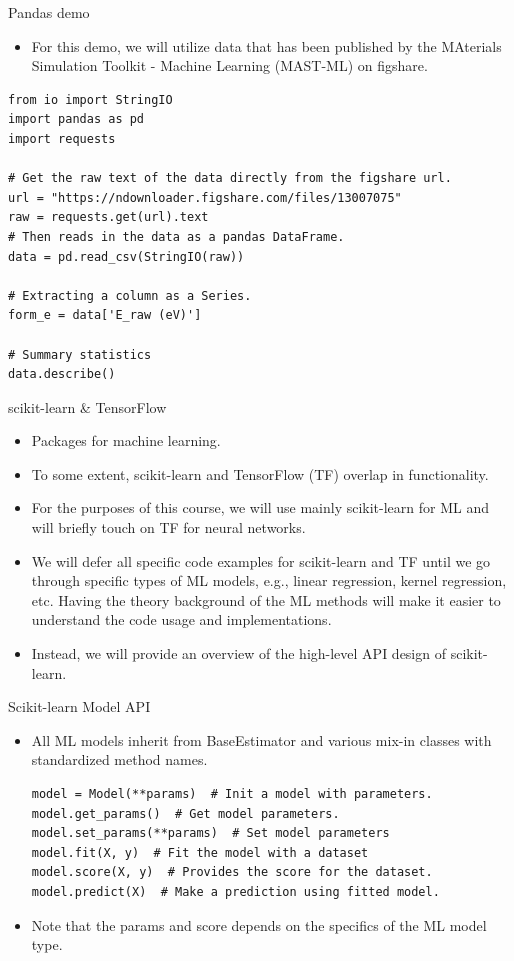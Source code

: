 \documentclass[aspectratio=169]{beamer}
\begin{document}
\begin{frame}[fragile]{Pandas demo}
    \begin{itemize}
        \item For this demo, we will utilize data that has been published by the MAterials Simulation Toolkit - Machine Learning (MAST-ML) on figshare.
    \end{itemize}
\begin{lstlisting}
from io import StringIO
import pandas as pd
import requests

# Get the raw text of the data directly from the figshare url.
url = "https://ndownloader.figshare.com/files/13007075"
raw = requests.get(url).text
# Then reads in the data as a pandas DataFrame.
data = pd.read_csv(StringIO(raw))

# Extracting a column as a Series.
form_e = data['E_raw (eV)']

# Summary statistics
data.describe()

\end{lstlisting}
\end{frame}


\begin{frame}{scikit-learn \& TensorFlow}
    \begin{itemize}
        \item Packages for machine learning.
        \item To some extent, scikit-learn and TensorFlow (TF) overlap in functionality.
        \item For the purposes of this course, we will use mainly scikit-learn for ML and will briefly touch on TF for neural networks.
        \item We will defer all specific code examples for scikit-learn and TF until we go through specific types of ML models, e.g., linear regression, kernel regression, etc. Having the theory background of the ML methods will make it easier to understand the code usage and implementations.
        \item Instead, we will provide an overview of the high-level API design of scikit-learn.
    \end{itemize}
\end{frame} 


\begin{frame}[fragile]{Scikit-learn Model API}
    \begin{itemize}
        \item All ML models inherit from BaseEstimator and various mix-in classes with standardized method names.
        \begin{lstlisting}
model = Model(**params)  # Init a model with parameters.
model.get_params()  # Get model parameters. 
model.set_params(**params)  # Set model parameters
model.fit(X, y)  # Fit the model with a dataset
model.score(X, y)  # Provides the score for the dataset.   
model.predict(X)  # Make a prediction using fitted model.
        \end{lstlisting}
        \item Note that the params and score depends on the specifics of the ML model type.
    \end{itemize}
\end{frame} 
\end{document}
